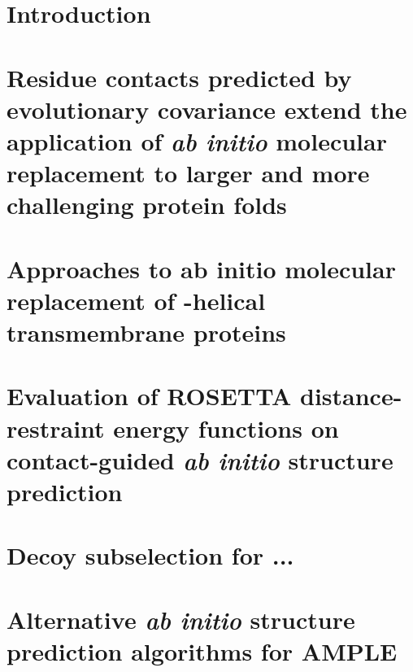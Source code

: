 \documentclass[11pt,oneside,leqno,openright]{report}
\begin{document}
% 
%
% 
%
%
%

\tableofcontents

%

\printglossary

\chapter{Introduction}
% 

\chapter{Residue contacts predicted by evolutionary covariance extend the application of \textit{ab initio} molecular replacement to larger and more challenging protein folds}
% 

\chapter{Approaches to ab initio molecular replacement of \textalpha-helical transmembrane proteins}
% 

\chapter{Evaluation of ROSETTA distance-restraint energy functions on contact-guided \textit{ab initio} structure prediction}


\chapter{Decoy subselection for ...}
% 

\chapter{Alternative \textit{ab initio} structure prediction algorithms for AMPLE}
% 
\end{document}
